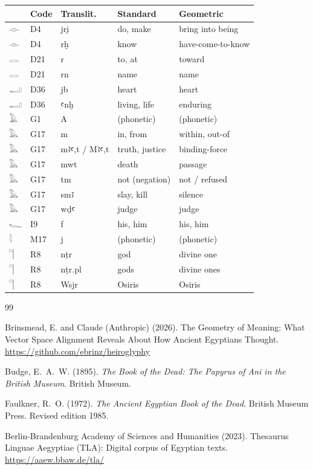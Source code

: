 \documentclass[11pt, a4paper]{article}
\newcommand{\hiero}[1]{{\normalfont\hierofont #1}}
\begin{document}
\vspace{8pt}

\footnotesize
\begin{longtable}{@{}lllp{1.1in}p{1.1in}@{}}
\toprule
 & \textbf{Code} & \textbf{Translit.} & \textbf{Standard} & \textbf{Geometric} \\
\midrule
\endhead
\hiero{𓁹} & D4 & jri̯ & do, make & bring into being \\
\hiero{𓁹} & D4 & rḫ & know & have-come-to-know \\
\hiero{𓂋} & D21 & r & to, at & toward \\
\hiero{𓂋} & D21 & rn & name & name \\
\hiero{𓂝} & D36 & jb & heart & heart \\
\hiero{𓂝} & D36 & ꜥnḫ & living, life & enduring \\
\hiero{𓄿} & G1 & A & (phonetic) & (phonetic) \\
\hiero{𓅓} & G17 & m & in, from & within, out-of \\
\hiero{𓅓} & G17 & mꜣꜥ,t / Mꜣꜥ,t & truth, justice & binding-force \\
\hiero{𓅓} & G17 & mwt & death & passage \\
\hiero{𓅓} & G17 & tm & not (negation) & not / refused \\
\hiero{𓅓} & G17 & smꜣ & slay, kill & silence \\
\hiero{𓅓} & G17 & wḏꜥ & judge & judge \\
\hiero{𓆑} & I9 & f & his, him & his, him \\
\hiero{𓇋} & M17 & j & (phonetic) & (phonetic) \\
\hiero{𓊹} & R8 & nṯr & god & divine one \\
\hiero{𓊹} & R8 & nṯr.pl & gods & divine ones \\
\hiero{𓊹} & R8 & Wsjr & Osiris & Osiris \\
\bottomrule
\end{longtable}

\normalsize


\begin{thebibliography}{99}

Brinsmead, E. and Claude (Anthropic) (2026).
\newblock The Geometry of Meaning: What Vector Space Alignment Reveals About How Ancient Egyptians Thought.
\newblock \url{https://github.com/ebrinz/heiroglyphy}

Budge, E.~A.~W. (1895).
\newblock \textit{The Book of the Dead: The Papyrus of Ani in the British Museum}.
\newblock British Museum.

Faulkner, R.~O. (1972).
\newblock \textit{The Ancient Egyptian Book of the Dead}.
\newblock British Museum Press. Revised edition 1985.

Berlin-Brandenburg Academy of Sciences and Humanities (2023).
\newblock Thesaurus Linguae Aegyptiae (TLA): Digital corpus of Egyptian texts.
\newblock \url{https://aaew.bbaw.de/tla/}

\end{thebibliography}
\end{document}
